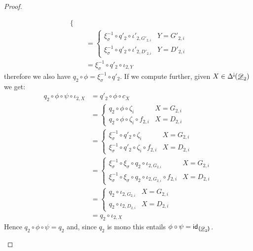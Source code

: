 \begin{proof}
\begin{enumerate}
\begin{align*}
\begin{cases}
	\end{cases}\\&=\begin{cases}
		\xi^{-1}_\sigma \circ q'_2\circ \iota'_{2, G'_{2,i}} & Y =G'_{2,i}\\
		\xi^{-1}_\sigma \circ q'_2\circ \iota'_{2, D'_{2,i}} & Y={D'_{2,i}}
	\end{cases}\\&= \xi^{-1}_\sigma \circ q'_2\circ \iota_{2, Y}
		\end{align*}
	therefore we also have $q_2\circ \phi =\xi^{-1}_{\sigma}\circ q'_2$.  If we compute further, given $X\in \Delta^{\hspace{-1pt}\downarrow\hspace{-1pt}}(\underline{\mathscr{D}}_2)$ we get:
		\begin{align*}
			q_2\circ \phi \circ \psi \circ \iota_{2, X}&=q'_2\circ \phi \circ c_X\\&=\begin{cases}
				q_2\circ \phi \circ \zeta_i & X=G_{2,i}\\
				q_2\circ \phi \circ \zeta_{i} \circ f_{2,i} & X=D_{2,i}
			\end{cases}\\&=\begin{cases}
				\xi^{-1}_{\sigma}\circ q'_2 \circ \zeta_i & X=G_{2,i}\\
				\xi^{-1}_{\sigma}\circ q'_2 \circ \zeta_{i} \circ f_{2,i} & X=D_{2,i}
			\end{cases}\\&=\begin{cases}
				\xi^{-1}_{\sigma} \circ \xi_\sigma \circ q_2\circ \iota_{2, G_{2,i}} & X=G_{2,i}\\
				\xi^{-1}_{\sigma}\circ \xi_\sigma \circ q_2\circ \iota_{2, G_{2,i}}  \circ f_{2,i} & X=D_{2,i}
			\end{cases}\\&=\begin{cases}
				q_2\circ \iota_{2, G_{2,i}} & X=G_{2,i}\\
				q_2\circ \iota_{2, D_{2,i}} & X=D_{2,i}
			\end{cases}\\&=q_2\circ \iota_{2,X}
		\end{align*}
		Hence $q_2\circ \phi \circ \psi = q_2$ and, since $q_2$ is mono this entails $\phi \circ \psi =\mathsf{id}_{\langle \hspace{-1.85pt}[ \underline{\mathscr{D}}_2 ]\hspace{-1.85pt}\rangle}$.
		

\end{enumerate}
\end{proof}
